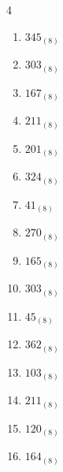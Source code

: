 \begin{multicols}{4}
\begin{enumerate}
  \item $345_{(8)}$

        \phantom{$=229$}

  \item $303_{(8)}$

        \phantom{$=195$}

  \item $167_{(8)}$

        \phantom{$=119$}

  \item $211_{(8)}$

        \phantom{$=137$}

  \item $201_{(8)}$

        \phantom{$=129$}

  \item $324_{(8)}$

        \phantom{$=212$}

  \item $41_{(8)}$

        \phantom{$=33$}

  \item $270_{(8)}$

        \phantom{$=184$}

\columnbreak %

  \item $165_{(8)}$

        \phantom{$=117$}

  \item $303_{(8)}$

        \phantom{$=195$}

  \item $45_{(8)}$

        \phantom{$=37$}

  \item $362_{(8)}$

        \phantom{$=242$}

  \item $103_{(8)}$

        \phantom{$=67$}

  \item $211_{(8)}$

        \phantom{$=137$}

  \item $120_{(8)}$

        \phantom{$=80$}

  \item $164_{(8)}$


\end{enumerate}
\end{multicols}
